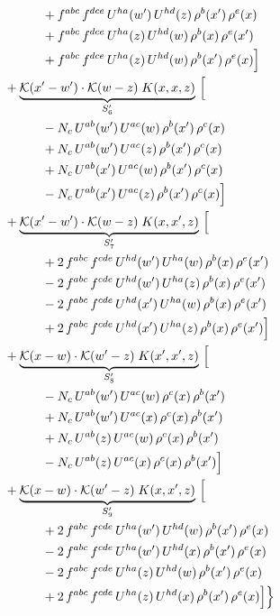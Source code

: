 \documentclass[10pt]{article}
\numberwithin{equation}{section}
\newcommand{\KK}{\mathcal K}
\begin{document}
\begin{align}
&\qquad\qquad +f^{abc}\,f^{dce}\,U^{ha}(w')\,U^{hd}(z)\,\rho^{b}(x')\,\rho^{e}(x)\notag\\
&\qquad\qquad +f^{abc}\,f^{dce}\,U^{ha}(z)\,U^{hd}(w)\,\rho^{b}(x)\,\rho^{e}(x')\notag\\
&\qquad\qquad +f^{abc}\,f^{dce}\,U^{ha}(z)\,U^{hd}(w)\,\rho^{b}(x')\,\rho^{e}(x)\Big]\notag\\
&\quad +\underbrace{\KK(x'-w')\cdot\KK(w-z)\;K(x,x,z)}_{S'_{6}}\,\Big[\notag\\
&\qquad\qquad - N_c\,U^{ab}(w')\,U^{ac}(w)\,\rho^{b}(x')\,\rho^{c}(x)\notag\\
&\qquad\qquad +N_c\,U^{ab}(w')\,U^{ac}(z)\,\rho^{b}(x')\,\rho^{c}(x)\notag\\
&\qquad\qquad +N_c\,U^{ab}(x')\,U^{ac}(w)\,\rho^{b}(x')\,\rho^{c}(x)\notag\\
&\qquad\qquad - N_c\,U^{ab}(x')\,U^{ac}(z)\,\rho^{b}(x')\,\rho^{c}(x)\Big]\notag\\
&\quad +\underbrace{\KK(x'-w')\cdot\KK(w-z)\;K(x,x',z)}_{S'_{7}}\,\Big[\notag\\
&\qquad\qquad +2\,f^{abc}\,f^{cde}\,U^{hd}(w')\,U^{ha}(w)\,\rho^{b}(x)\,\rho^{e}(x')\notag\\
&\qquad\qquad -2\,f^{abc}\,f^{cde}\,U^{hd}(w')\,U^{ha}(z)\,\rho^{b}(x)\,\rho^{e}(x')\notag\\
&\qquad\qquad -2\,f^{abc}\,f^{cde}\,U^{hd}(x')\,U^{ha}(w)\,\rho^{b}(x)\,\rho^{e}(x')\notag\\
&\qquad\qquad +2\,f^{abc}\,f^{cde}\,U^{hd}(x')\,U^{ha}(z)\,\rho^{b}(x)\,\rho^{e}(x')\Big]\notag\\
&\quad +\underbrace{\KK(x-w)\cdot\KK(w'-z)\;K(x',x',z)}_{S'_{8}}\,\Big[\notag\\
&\qquad\qquad - N_c\,U^{ab}(w')\,U^{ac}(w)\,\rho^{c}(x)\,\rho^{b}(x')\notag\\
&\qquad\qquad +N_c\,U^{ab}(w')\,U^{ac}(x)\,\rho^{c}(x)\,\rho^{b}(x')\notag\\
&\qquad\qquad +N_c\,U^{ab}(z)\,U^{ac}(w)\,\rho^{c}(x)\,\rho^{b}(x')\notag\\
&\qquad\qquad - N_c\,U^{ab}(z)\,U^{ac}(x)\,\rho^{c}(x)\,\rho^{b}(x')\Big]\notag\\
&\quad +\underbrace{\KK(x-w)\cdot\KK(w'-z)\;K(x,x',z)}_{S'_{9}}\,\Big[\notag\\
&\qquad\qquad +2\,f^{abc}\,f^{cde}\,U^{ha}(w')\,U^{hd}(w)\,\rho^{b}(x')\,\rho^{e}(x)\notag\\
&\qquad\qquad -2\,f^{abc}\,f^{cde}\,U^{ha}(w')\,U^{hd}(x)\,\rho^{b}(x')\,\rho^{e}(x)\notag\\
&\qquad\qquad -2\,f^{abc}\,f^{cde}\,U^{ha}(z)\,U^{hd}(w)\,\rho^{b}(x')\,\rho^{e}(x)\notag\\
&\qquad\qquad +2\,f^{abc}\,f^{cde}\,U^{ha}(z)\,U^{hd}(x)\,\rho^{b}(x')\,\rho^{e}(x)\Big]\Big\}\label{eq:Bdecomp}
\end{align}
\end{document}
